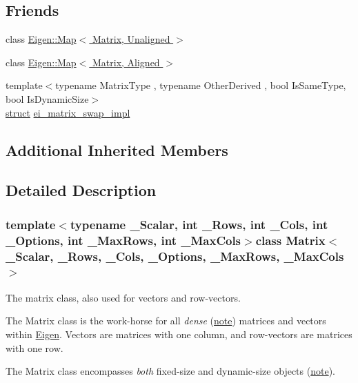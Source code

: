 \subsection*{Friends}
\begin{DoxyCompactItemize}
\item 
class \hyperlink{class_matrix_a1322812c8fab9e467c90dc8df08bf7dd}{Eigen\-::\-Map$<$ Matrix, Unaligned $>$}
\item 
class \hyperlink{class_matrix_a26bfc15b405d2f93f168b19fd68b7441}{Eigen\-::\-Map$<$ Matrix, Aligned $>$}
\item 
{\footnotesize template$<$typename Matrix\-Type , typename Other\-Derived , bool Is\-Same\-Type, bool Is\-Dynamic\-Size$>$ }\\\hyperlink{sdlgamepad_8dox_aba655c5729da86df745f0c8e7f9ba8d2}{struct} \hyperlink{class_matrix_a6aa443d64e3eddedd334b47526dd3d55}{ei\-\_\-matrix\-\_\-swap\-\_\-impl}
\end{DoxyCompactItemize}
\subsection*{Additional Inherited Members}


\subsection{Detailed Description}
\subsubsection*{template$<$typename \-\_\-\-Scalar, int \-\_\-\-Rows, int \-\_\-\-Cols, int \-\_\-\-Options, int \-\_\-\-Max\-Rows, int \-\_\-\-Max\-Cols$>$class Matrix$<$ \-\_\-\-Scalar, \-\_\-\-Rows, \-\_\-\-Cols, \-\_\-\-Options, \-\_\-\-Max\-Rows, \-\_\-\-Max\-Cols $>$}

The matrix class, also used for vectors and row-\/vectors. 

The Matrix class is the work-\/horse for all {\itshape dense} (\hyperlink{class_matrix_dense}{note}) matrices and vectors within \hyperlink{namespace_eigen}{Eigen}. Vectors are matrices with one column, and row-\/vectors are matrices with one row.

The Matrix class encompasses {\itshape both} fixed-\/size and dynamic-\/size objects (\hyperlink{class_matrix_fixedsize}{note}).

